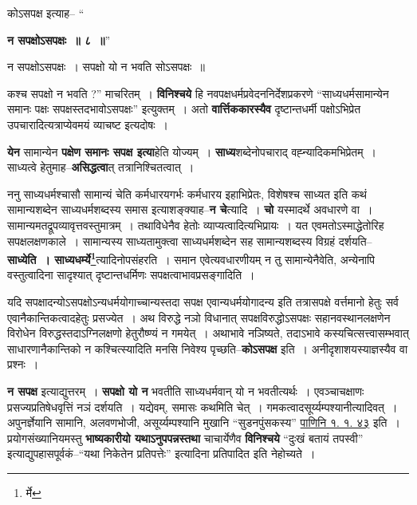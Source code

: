 \documentclass[article,12pt,a4paper]{memoir}
\begin{document}
	कोऽसपक्ष इत्याह-- “
	  
	\textbf{न सपक्षोऽसपक्षः ॥ ८ ॥}” 
	  
	न सपक्षोऽसपक्षः । सपक्षो यो न भवति सोऽसपक्षः ॥ 
	  
	कश्च सपक्षो न भवति ?” माचरितम् । \textbf{विनिश्चये} हि नवपक्षधर्मप्रवेदननिर्देशप्रकरणे “साध्यधर्मसामान्येन समानः पक्षः सपक्षस्तदभावोऽसपक्षः” इत्युक्तम् । अतो \textbf{वार्त्तिककारस्यैव} दृष्टान्तधर्मी पक्षोऽभिप्रेत उपचारादित्यत्राप्येवमयं व्याचष्ट इत्यदोषः ।
	\pend
      

	  \pstart \textbf{येन} सामान्येन \textbf{पक्षेण समानः सपक्ष इत्या}हेति योज्यम् । \textbf{साध्य}शब्देनोपचाराद् वह्न्यादिकमभिप्रेतम् । साध्यत्वे हेतुमाह--\textbf{असिद्धत्वा}त् तत्रानिश्चितत्वात् ।
	\pend
      

	  \pstart ननु साध्यधर्मश्चासौ सामान्यं चेति कर्मधारयगर्भः कर्मधारय इहाभिप्रेतः, विशेषश्च साध्यत इति कथं सामान्यशब्देन साध्यधर्मशब्दस्य समास इत्याशङ्क्याह--\textbf{न चे}त्यादि । \textbf{चो} यस्मादर्थे अवधारणे वा । सामान्यमतद्रूपव्यावृत्तवस्तुमात्रम् । तथाविधेनैव हेतोः \leavevmode{} व्याप्यत्वादित्यभिप्रायः । यत एवमतोऽस्माद्धेतोरिह सपक्षलक्षणकाले । सामान्यस्य साध्यतामुक्त्वा साध्यधर्मशब्देन सह सामान्यशब्दस्य विग्रहं दर्शयति--\textbf{साध्येति । साध्यधर्म्ये\footnote{र्मे}\-}त्यादिनोपसंहरति । समान एवेत्यवधारणीयम् न तु सामान्येनैवेति, अन्येनापि वस्तुत्वादिना सादृश्यात् दृष्टान्तधर्मिणः सपक्षत्वाभावप्रसङ्गादिति ।
	\pend
      

	  \pstart यदि सपक्षादन्योऽसपक्षोऽन्यधर्मयोगाच्चान्यस्तदा सपक्ष एवान्यधर्मयोगादन्य इति तत्रासपक्षे वर्त्तमानो हेतुः सर्व एवानैकान्तिकत्वादहेतुः प्रसज्येत । अथ विरुद्धे नञो विधानात् सपक्षविरुद्धोऽसपक्षः सहानवस्थानलक्षणेन विरोधेन विरुद्धस्तदाऽग्निलक्षणो हेतुरौष्ण्यं न गमयेत् । अथाभावे नञिष्यते, तदाऽभावे कस्यचित्सत्त्वासम्भवात् साधारणानैकान्तिको न कश्चित्स्यादिति मनसि निवेश्य पृच्छति--\textbf{कोऽसपक्ष} इति । अनीदृशाशयस्याज्ञस्यैव वा प्रश्नः ।
	\pend
      

	  \pstart \textbf{न सपक्ष} इत्याद्युत्तरम् । \textbf{सपक्षो यो न} भवतीति साध्यधर्मवान् यो न भवतीत्यर्थः । एवञ्चाचक्षाणः प्रसज्यप्रतिषेधवृत्तिं नञं दर्शयति । यद्येवम्, समासः कथमिति चेत् । गमकत्वादसूर्य्यम्पश्यानीत्यादिवत् । अपुनर्ज्ञेयानि सामानि, अलवणभोजी, असूर्य्यम्पश्यानि मुखानि “सुडनपुंसकस्य” \href{http://http://sarit.indology.info/?cref=Pā.1.1.43}{पाणिनि १. १. ४३} इति । प्रयोगसंख्यानियमस्तु \textbf{भाष्यकारीयो यथाऽनुपपन्नस्तथा} चाचार्येणैव \textbf{विनिश्चये} “दुःखं बतायं तपस्वी” इत्याद्युपहासपूर्वकं--“यथा निकेतेन प्रतिपत्तेः” इत्यादिना प्रतिपादित इति नेहोच्यते ।
	\pend
	  \bigskip
	  \begingroup
	
\end{document}
